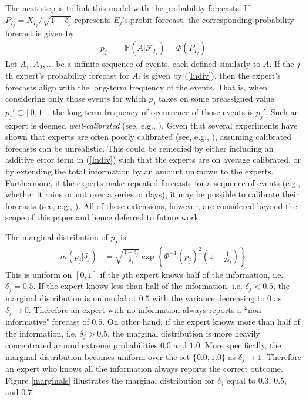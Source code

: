 \documentclass[11pt]{article}
\renewcommand{\P}{\mathbb{P}}
\theoremstyle{definition}
\theoremstyle{definition}
\begin{document}
The next step is to link this model with the probability forecasts. If  $P_{I_j} = X_{I_j}/\sqrt{1-\delta_j}$ represents $E_j$'s probit-forecast, the corresponding probability forecast is given by
\begin{align}
p_j &= \P\left(A | \mathcal{F}_{I_j}\right) = \Phi\left( P_{I_j}\right) \label{Indiv}
\end{align}
Let $A_1, A_2, \dots$ be a infinite sequence of events, each defined similarly to $A$. If the $j$th expert's probability forecast for $A_i$ is given by (\ref{Indiv}), then the expert's forecasts align with the long-term frequency of the events. That is, when considering only those events for which $p_j$ takes on some preassigned value $p_j' \in [0, 1]$, the long term frequency of occurrence of those events is $p_j'$. Such an expert is deemed \textit{well-calibrated} (see, e.g., \cite{degroot1983comparison}). Given that several experiments have shown that experts are often poorly calibrated (see, e.g., \cite{cooke1991experts, shlyakhter1994quantifying}), assuming calibrated forecasts can be unrealistic. This could be remedied by  either including an additive error term in (\ref{Indiv}) such that the experts are on average calibrated, or by extending the total information by an amount unknown to the experts. Furthermore, if the experts make repeated forecasts for a sequence of events (e.g., whether it rains or not over a series of days), it may be possible to calibrate their forecasts (see, e.g., \citet{foster1998asymptotic, Brier}). All of these extensions, however, are considered beyond the scope of this paper and hence deferred to future work.

The marginal distribution of $p_j$ is
\begin{align*}
m(p_j | \delta_j) &= \sqrt{\frac{1-\delta_j}{\delta_j}} \exp \left\{ \Phi^{-1}(p_j)^2 \left(1-\frac{1}{2 \delta_j} \right) \right\} 
\end{align*}
This is uniform on $[0,1]$ if the $j$th expert knows half of the information, i.e. $\delta_j = 0.5$. If the expert knows less than half of the information, i.e. $\delta_j < 0.5$, the marginal distribution is unimodal at $0.5$ with the variance decreasing to 0 as $\delta_j \to 0$. Therefore an expert with no information always reports a ``non-informative" forecast of $0.5$. On other hand, if the expert knows more than half of the information, i.e. $\delta_j > 0.5$, the marginal  distribution is more heavily concentrated around extreme probabilities $0.0$ and $1.0$. More specifically, the marginal distribution becomes uniform over the set $\{0.0,1.0\}$ as $\delta_j \to 1$. Therefore an expert who knows all the information always reports the correct outcome. Figure \ref{marginals} illustrates the marginal distribution for $\delta_j$ equal to $0.3$, $0.5$, and $0.7$. 
\end{document}
